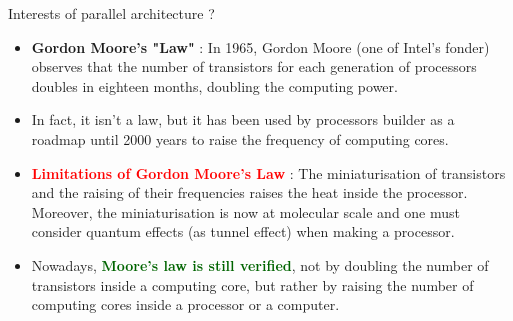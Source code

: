 \documentclass[compress,10pt,aspectratio=169]{beamer}
\begin{document}
\begin{frame}[fragile]{Interests of parallel architecture ?}
    \small
    \begin{itemize}
        \item \textbf{\textcolor{NavyBlue}{Gordon Moore's "Law"}} : In 1965, Gordon Moore (one of Intel's fonder) observes that the number of transistors
              for each generation of processors doubles in eighteen months, doubling the computing power.
        \item In fact, \alert{it isn't a law}, but it has been used by processors builder as a roadmap until 2000 years to raise the frequency
              of computing cores.
        \item \textbf{\textcolor{red}{Limitations of Gordon Moore's Law}} : The miniaturisation of transistors and the raising of their
              frequencies raises the heat inside the processor. Moreover, the miniaturisation is now at molecular scale and one must
              consider quantum effects (as tunnel effect) when making a processor.
        \item Nowadays, \textbf{\textcolor{DarkGreen}{Moore's law is still verified}}, not by doubling the number of transistors 
              inside a computing core, but rather by raising the number of computing cores inside a processor or a computer.
    \end{itemize}
\end{frame}
\end{document}
